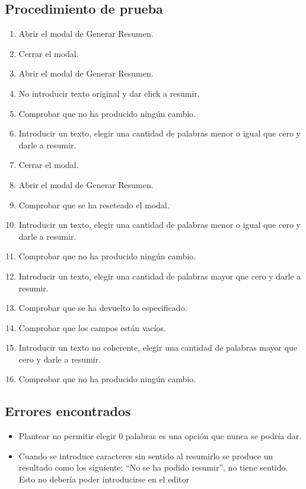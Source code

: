 \subsection{Procedimiento de prueba}
\label{procedimientoPruebas:resumen}
\begin{enumerate}
    \item Abrir el modal de Generar Resumen.
    \item Cerrar el modal.
    \item Abrir el modal de Generar Resumen.
    \item No introducir texto original y dar click a resumir.
    \item Comprobar que no ha producido ningún cambio.
    \item Introducir un texto, elegir una cantidad de palabras menor o igual que cero y darle a resumir.
    \item Cerrar el modal.
    \item Abrir el modal de Generar Resumen.
    \item Comprobar que se ha reseteado el modal.
    \item Introducir un texto, elegir una cantidad de palabras menor o igual que cero y darle a resumir.
    \item Comprobar que no ha producido ningún cambio.
    \item Introducir un texto, elegir una cantidad de palabras mayor que cero y darle a resumir.
    \item Comprobar que se ha devuelto lo especificado.
    \item Comprobar que los campos están vacíos.
    \item Introducir un texto no coherente, elegir una cantidad de palabras mayor que cero y darle a resumir.
    \item Comprobar que no ha producido ningún cambio.

\end{enumerate}

\subsection{Errores encontrados}
\label{errores:resumen}
\begin{itemize}
    \item Plantear no permitir elegir 0 palabras es una opción que nunca se podría dar.
    \item Cuando se introduce caracteres sin sentido al resumirlo se produce un resultado como los siguiente: ``No se ha podido resumir'', no tiene sentido. Esto no debería poder introducirse en el editor
\end{itemize}

